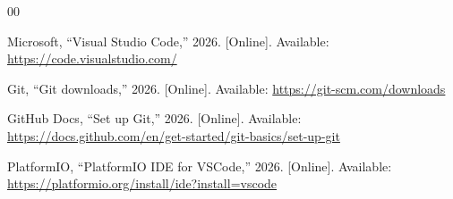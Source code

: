 \documentclass[12pt,onecolumn]{article}
\begin{document}
\begin{thebibliography}{00}

Microsoft, ``Visual Studio Code,'' 2026. [Online]. Available:
\url{https://code.visualstudio.com/}

Git, ``Git downloads,'' 2026. [Online]. Available:
\url{https://git-scm.com/downloads}

GitHub Docs, ``Set up Git,'' 2026. [Online]. Available:
\url{https://docs.github.com/en/get-started/git-basics/set-up-git}

PlatformIO, ``PlatformIO IDE for VSCode,'' 2026. [Online]. Available:
\url{https://platformio.org/install/ide?install=vscode}

\end{thebibliography}
\end{document}
